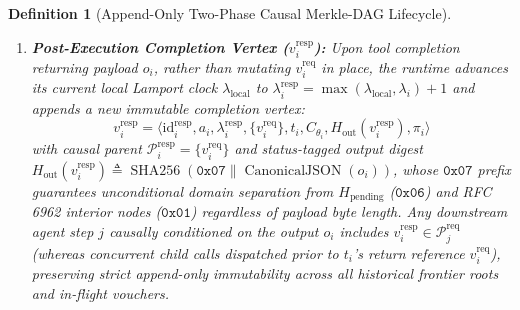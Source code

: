 \documentclass[conference,10pt]{IEEEtran}
\newtheorem{definition}{Definition}
\begin{document}
\begin{definition}[Append-Only Two-Phase Causal Merkle-DAG Lifecycle]
\begin{enumerate}
\begin{equation}
\begin{split}
    &\triangleq \operatorname{SHA256}\big(\mathtt{0x02} \parallel r_i \parallel \operatorname{CanonicalJSON}(\theta_i)\big)
    \end{split}
    \end{equation}
    The immutable request vertex tuple is defined as:
    \begin{equation}
    v_i^{\text{req}} = \langle \text{id}_i^{\text{req}}, a_i, \lambda_i, \mathcal{P}_i^{\text{req}}, t_i, C_{\theta_i}, H_{\text{out}}(v_i^{\text{req}}), \pi_i \rangle
    \end{equation}
    where $a_i$ is the calling agent, $\lambda_i \in \mathbb{N}$ is the causal Lamport clock at dispatch, $\mathcal{P}_i^{\text{req}} = \{v_p \mid (v_p, v_i^{\text{req}}) \in \mathcal{E}\}$ is the set of causal parent vertices active in the agent's sub-session context at dispatch time, $H_{\text{out}}(v_i^{\text{req}}) \triangleq H_{\text{pending}} \triangleq \operatorname{SHA256}(\mathtt{0x06} \parallel \text{``PENDING\_EXECUTION''})$, and $\pi_i$ is the policy-invariant attestation token. The digest $H_{\text{leaf}} \triangleq H(v_i^{\text{req}})$ is permanently embedded in the wire ZKA-Voucher $\mathcal{V}_{\text{wire}}$.
    \item \textbf{Post-Execution Completion Vertex ($v_i^{\text{resp}}$):} Upon tool completion returning payload $o_i$, rather than mutating $v_i^{\text{req}}$ in place, the runtime advances its current local Lamport clock $\lambda_{\text{local}}$ to $\lambda_i^{\text{resp}} = \max(\lambda_{\text{local}}, \lambda_i) + 1$ and appends a new immutable completion vertex:
    \begin{equation}
    v_i^{\text{resp}} = \langle \text{id}_i^{\text{resp}}, a_i, \lambda_i^{\text{resp}}, \{v_i^{\text{req}}\}, t_i, C_{\theta_i}, H_{\text{out}}(v_i^{\text{resp}}), \pi_i \rangle
    \end{equation}
    with causal parent $\mathcal{P}_i^{\text{resp}} = \{v_i^{\text{req}}\}$ and status-tagged output digest $H_{\text{out}}(v_i^{\text{resp}}) \triangleq \operatorname{SHA256}(\mathtt{0x07} \parallel \operatorname{CanonicalJSON}(o_i))$, whose $\mathtt{0x07}$ prefix guarantees unconditional domain separation from $H_{\text{pending}}$ ($\mathtt{0x06}$) and RFC 6962 interior nodes ($\mathtt{0x01}$) regardless of payload byte length. Any downstream agent step $j$ causally conditioned on the output $o_i$ includes $v_i^{\text{resp}} \in \mathcal{P}_j^{\text{req}}$ (whereas concurrent child calls dispatched prior to $t_i$'s return reference $v_i^{\text{req}}$), preserving strict append-only immutability across all historical frontier roots and in-flight vouchers.
\end{enumerate}
\end{definition}
\end{document}

